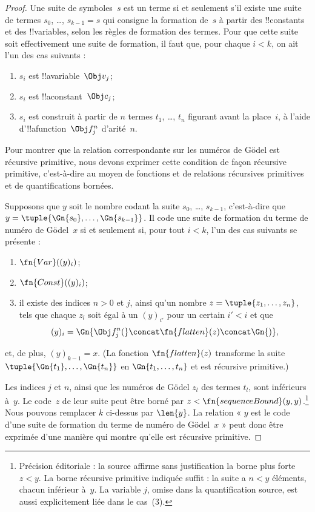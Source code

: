\documentclass[../../../include/open-logic-section]{subfiles}
\begin{document}
\begin{proof}
Une suite de symboles~$s$ est un terme si et seulement s'il existe
une suite de termes $s_0$, \dots, $s_{k-1} = s$ qui consigne la
formation de~$s$ à partir des !!{constant}s et des !!{variable}s,
selon les règles de formation des termes. Pour que cette suite soit
effectivement une suite de formation, il faut que, pour chaque $i<k$,
on ait l'un des cas suivants :
\begin{enumerate}
\item $s_i$ est !!a{variable}~$\Obj v_j$;
\item $s_i$ est !!a{constant}~$\Obj c_j$;
\item $s_i$ est construit à partir de $n$ termes $t_1$, \dots, $t_n$
  figurant avant la place~$i$, à l'aide d'!!a{function}~$\Obj f^n_j$
  d'arité~$n$.
\end{enumerate}
Pour montrer que la relation correspondante sur les numéros de
G\"odel est récursive primitive, nous devons exprimer cette
condition de façon récursive primitive, c'est-à-dire au moyen de
fonctions et de relations récursives primitives et de
quantifications bornées.

Supposons que $y$ soit le nombre codant la suite $s_0$, \dots,
$s_{k-1}$, c'est-à-dire que
$y = \tuple{\Gn{s_0}, \dots, \Gn{s_{k-1}}}$. Il code une suite de
formation du terme de numéro de G\"odel~$x$ si et seulement si,
pour tout $i<k$, l'un des cas suivants se présente :
\begin{enumerate}
\item $\fn{Var}((y)_i)$;
\item $\fn{Const}((y)_i)$;
\item il existe des indices $n>0$ et $j$, ainsi qu'un nombre
  $z = \tuple{z_1, \dots, z_n}$, tels que chaque $z_l$ soit égal à un
  $(y)_{i'}$ pour un certain $i'<i$ et que
\[
(y)_i = \Gn{\Obj f^n_j(} \concat \fn{flatten}(z) \concat \Gn{)},
\]
\end{enumerate}
et, de plus, $(y)_{k-1} = x$. (La fonction $\fn{flatten}(z)$
transforme la suite $\tuple{\Gn{t_1}, \dots, \Gn{t_n}}$ en
$\Gn{t_1, \dots,
  t_n}$ et est récursive primitive.)

Les indices $j$ et $n$, ainsi que les numéros de G\"odel $z_l$ des termes
$t_l$, sont inférieurs à~$y$. Le code~$z$ de leur suite peut être borné par
$z<\fn{sequenceBound}(y,y)$.\footnote{Précision éditoriale : la source affirme sans justification la borne plus forte $z<y$. La borne récursive primitive indiquée suffit : la suite a $n<y$ éléments, chacun inférieur à~$y$. La variable $j$, omise dans la quantification source, est aussi explicitement liée dans le cas~(3).} Nous pouvons
remplacer $k$ ci-dessus par $\len{y}$. La relation « $y$ est le code
d'une suite de formation du terme de numéro de G\"odel~$x$ » peut
donc être exprimée d'une manière qui montre qu'elle est récursive
primitive.


\end{proof}
\end{document}

